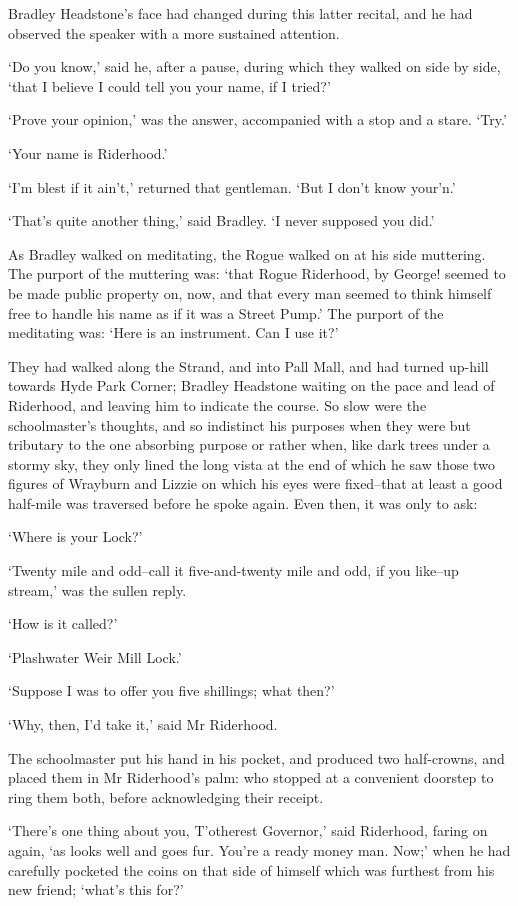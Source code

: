 Bradley Headstone’s face had changed during this latter recital, and he
had observed the speaker with a more sustained attention.

‘Do you know,’ said he, after a pause, during which they walked on side
by side, ‘that I believe I could tell you your name, if I tried?’

‘Prove your opinion,’ was the answer, accompanied with a stop and a
stare. ‘Try.’

‘Your name is Riderhood.’

‘I’m blest if it ain’t,’ returned that gentleman. ‘But I don’t know
your’n.’

‘That’s quite another thing,’ said Bradley. ‘I never supposed you did.’

As Bradley walked on meditating, the Rogue walked on at his side
muttering. The purport of the muttering was: ‘that Rogue Riderhood, by
George! seemed to be made public property on, now, and that every man
seemed to think himself free to handle his name as if it was a Street
Pump.’ The purport of the meditating was: ‘Here is an instrument. Can I
use it?’

They had walked along the Strand, and into Pall Mall, and had turned
up-hill towards Hyde Park Corner; Bradley Headstone waiting on the pace
and lead of Riderhood, and leaving him to indicate the course. So slow
were the schoolmaster’s thoughts, and so indistinct his purposes when
they were but tributary to the one absorbing purpose or rather when,
like dark trees under a stormy sky, they only lined the long vista at
the end of which he saw those two figures of Wrayburn and Lizzie on
which his eyes were fixed--that at least a good half-mile was traversed
before he spoke again. Even then, it was only to ask:

‘Where is your Lock?’

‘Twenty mile and odd--call it five-and-twenty mile and odd, if you
like--up stream,’ was the sullen reply.

‘How is it called?’

‘Plashwater Weir Mill Lock.’

‘Suppose I was to offer you five shillings; what then?’

‘Why, then, I’d take it,’ said Mr Riderhood.

The schoolmaster put his hand in his pocket, and produced two
half-crowns, and placed them in Mr Riderhood’s palm: who stopped at
a convenient doorstep to ring them both, before acknowledging their
receipt.

‘There’s one thing about you, T’otherest Governor,’ said Riderhood,
faring on again, ‘as looks well and goes fur. You’re a ready money man.
Now;’ when he had carefully pocketed the coins on that side of himself
which was furthest from his new friend; ‘what’s this for?’

